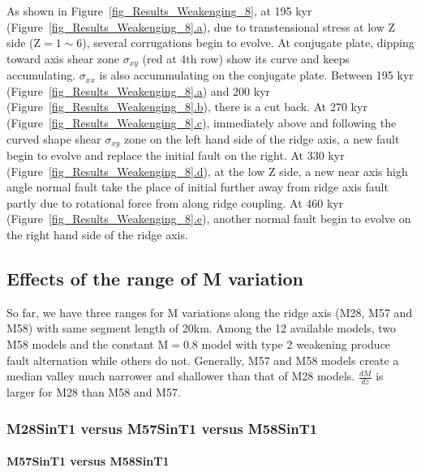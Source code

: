 As shown in Figure~\hyperref[fig_Results_Weakenging_8]{\ref{fig_Results_Weakenging_8}}, at 195 kyr (Figure~\hyperref[fig_Results_Weakenging_8]{\ref{fig_Results_Weakenging_8}.a}), due to transtensional stress at low Z side (Z$=1\sim6$), several corrugations begin to evolve. At conjugate plate, dipping toward axis shear zone $\sigma_{xy}$ (red at 4th row) show its curve and keeps accumulating. $\sigma_{xx}$ is also accummulating on the conjugate plate. Between 195 kyr (Figure~\hyperref[fig_Results_Weakenging_8]{\ref{fig_Results_Weakenging_8}.a}) and 200 kyr (Figure~\hyperref[fig_Results_Weakenging_8]{\ref{fig_Results_Weakenging_8}.b}), there is a cut back. At 270 kyr (Figure~\hyperref[fig_Results_Weakenging_8]{\ref{fig_Results_Weakenging_8}.c}), immediately above and following the curved shape shear $\sigma_{xy}$ zone on the left hand side of the ridge axis, a new fault begin to evolve and replace the initial fault on the right. At 330 kyr (Figure~\hyperref[fig_Results_Weakenging_8]{\ref{fig_Results_Weakenging_8}.d}), at the low Z side, a new near axis high angle normal fault take the place of initial further away from ridge axis fault partly due to rotational force from along ridge coupling. At 460 kyr (Figure~\hyperref[fig_Results_Weakenging_8]{\ref{fig_Results_Weakenging_8}.e}), another normal fault begin to evolve on the right hand side of the ridge axis.

\subsection{Effects of the range of M variation}
So far, we have three ranges for M variations along the ridge axis (M28, M57 and M58) with same segment length of 20km. Among the 12 available models, two M58 models and the constant M$=0.8$ model with type 2 weakening produce fault alternation while others do not. Generally, M57 and M58 models create a median valley much narrower and shallower than that of M28 models. $\frac{dM}{dz}$ is larger for M28 than M58 and M57.

\subsubsection{M28SinT1 versus M57SinT1 versus M58SinT1}

\paragraph{M57SinT1 versus M58SinT1}\label{M57SinT1 versus M58SinT1}

